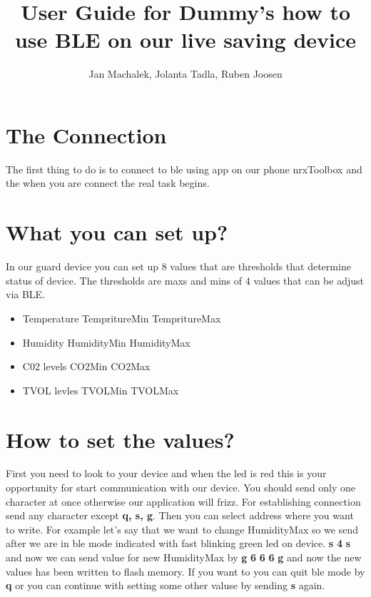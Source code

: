 \documentclass[11pt,a4paper]{report}
\author{Jan Machalek, Jolanta Tadla, Ruben Joosen}
\title{User Guide for Dummy's how to use BLE on our live saving device}
\begin{document}
\maketitle
\section{The Connection}
The first thing to do is to connect to ble using app on our phone nrxToolbox and the when you are connect the real task begins.
\section{What you can set up?}
In our guard device you can set up 8 values that are thresholds that determine status of device.
The thresholds are maxs and mins of 4 values that can be adjust via BLE.
\begin{itemize}
\item Temperature \quad	TempritureMin \quad TempritureMax
\item  Humidity \quad	HumidityMin \quad HumidityMax
\item  C02 levels \quad	CO2Min \quad CO2Max
\item  TVOL levles \quad	TVOLMin \quad TVOLMax
\end{itemize}
\section{How to set the values?}
First you need to look to your device and when the led is red this is your opportunity for start communication with our device. You should send only one character at once otherwise our application will frizz. For establishing connection send any character except \textbf{q, s, g}. Then you can select address where you want to write. For example let's say that we want to change HumidityMax so we send after we are in ble mode indicated with fast blinking green led on device. \textbf{s} \textbf{4} \textbf{s} and now we can send value for new HumidityMax by \textbf{g} \textbf{6} \textbf{6} \textbf{6} \textbf{g} and now the new values has been written to flash memory. If you want to you can quit ble mode by \textbf{q} or you can continue with setting some other valuse by sending \textbf{s} again.
\end{document}
